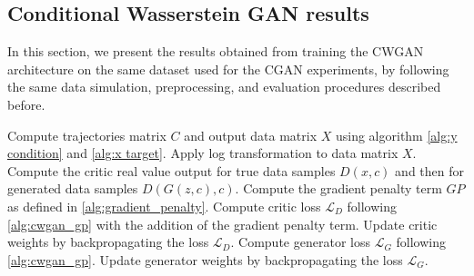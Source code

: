 \subsection{Conditional Wasserstein GAN results}
In this section, we present the results obtained from training the CWGAN architecture on the same dataset used for the CGAN experiments, 
by following the same data simulation, preprocessing, and evaluation procedures described before.\\


\begin{algorithm}[H]
    \caption{Training process for CWGAN-GP model}
    \label{alg:cwgan train}
    \begin{algorithmic}[1]

    \STATE Compute trajectories matrix $C$ and output data matrix $X$ using algorithm \ref{alg:y condition} and \ref{alg:x target}.
    \STATE Apply log transformation to data matrix $X$.
        \STATE Compute the critic real value output for true data samples $D(x,c)$ and then for generated data samples $D(G(z,c),c)$.
        \STATE Compute the gradient penalty term $GP$ as defined in \ref{alg:gradient_penalty}.
        \STATE Compute critic loss $\mathcal{L}_D$ following \ref{alg:cwgan_gp} with the addition of the gradient penalty term.
        \STATE Update critic weights by backpropagating the loss $\mathcal{L}_D$.
        \STATE Compute generator loss $\mathcal{L}_G$ following \ref{alg:cwgan_gp}.
        \STATE Update generator weights by backpropagating the loss $\mathcal{L}_G$.
    \ENDFOR
    \end{algorithmic}
\end{algorithm}

